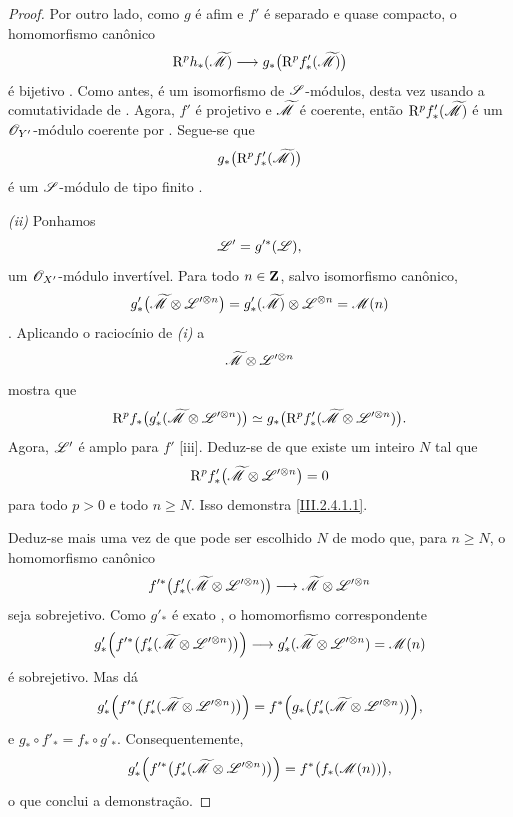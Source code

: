 \begin{proof}
Por outro lado, como $g$ é afim e $f'$ é separado e quase compacto, o homomorfismo canônico
\[
  \mathrm{R}^p h_*(\widetilde{\mathscr{M}})
  \longrightarrow
  g_*\bigl(\mathrm{R}^p f'_*(\widetilde{\mathscr{M}})\bigr)
\]
é bijetivo .
Como antes, é um isomorfismo de $\mathscr{S}$-módulos, desta vez usando a comutatividade de .
Agora, $f'$ é projetivo e $\widetilde{\mathscr{M}}$ é coerente, então $\mathrm{R}^p f'_*(\widetilde{\mathscr{M}})$ é um $\mathscr{O}_{Y'}$-módulo coerente por .
Segue-se que
\[
  g_*\bigl(\mathrm{R}^p f'_*(\widetilde{\mathscr{M}})\bigr)
\]
é um $\mathscr{S}$-módulo de tipo finito .

\emph{(ii)} Ponhamos
\[
  \mathscr{L}'=g'^*(\mathscr{L}),
\]
um $\mathscr{O}_{X'}$-módulo invertível.
Para todo $n\in\mathbf Z$, salvo isomorfismo canônico,
\[
  g'_*\bigl(\widetilde{\mathscr{M}}\otimes\mathscr{L}'^{\otimes n}\bigr)
  =
  g'_*(\widetilde{\mathscr{M}})\otimes\mathscr{L}^{\otimes n}
  =
  \mathscr{M}(n)
\]
.
Aplicando o raciocínio de \emph{(i) } a
\[
  \widetilde{\mathscr{M}}\otimes\mathscr{L}'^{\otimes n}
\]
mostra que
\[
  \mathrm{R}^p f_*
  \bigl(g'_*(\widetilde{\mathscr{M}}\otimes\mathscr{L}'^{\otimes n})\bigr)
  \simeq
  g_*\bigl(\mathrm{R}^p f'_*
  (\widetilde{\mathscr{M}}\otimes\mathscr{L}'^{\otimes n})\bigr).
\]
Agora, $\mathscr{L}'$ é amplo para $f'$  [iii].
Deduz-se de  que existe um inteiro $N$ tal que
\[
  \mathrm{R}^p f'_*
  \bigl(\widetilde{\mathscr{M}}\otimes\mathscr{L}'^{\otimes n}\bigr)=0
\]
para todo $p>0$ e todo $n\geq N$.
Isso demonstra \eqref{III.2.4.1.1}.

Deduz-se mais uma vez de  que pode ser escolhido $N$ de modo que, para $n\geq N$, o homomorfismo canônico
\[
  f'^*\bigl(f'_*(\widetilde{\mathscr{M}}\otimes\mathscr{L}'^{\otimes n})\bigr)
  \longrightarrow
  \widetilde{\mathscr{M}}\otimes\mathscr{L}'^{\otimes n}
\]
seja sobrejetivo.
Como $g'_*$ é exato , o homomorfismo correspondente
\[
  g'_*\Bigl(
    f'^*\bigl(f'_*(\widetilde{\mathscr{M}}\otimes\mathscr{L}'^{\otimes n})\bigr)
  \Bigr)
  \longrightarrow
  g'_*(\widetilde{\mathscr{M}}\otimes\mathscr{L}'^{\otimes n})
  =\mathscr{M}(n)
\]
é sobrejetivo.
Mas  dá
\[
  g'_*\Bigl(
    f'^*\bigl(f'_*(\widetilde{\mathscr{M}}\otimes\mathscr{L}'^{\otimes n})\bigr)
  \Bigr)
  =
  f^*\Bigl(
    g_*\bigl(f'_*(\widetilde{\mathscr{M}}\otimes\mathscr{L}'^{\otimes n})\bigr)
  \Bigr),
\]
e $g_*\circ f'_*=f_*\circ g'_*$.
Consequentemente,
\[
  g'_*\Bigl(
    f'^*\bigl(f'_*(\widetilde{\mathscr{M}}\otimes\mathscr{L}'^{\otimes n})\bigr)
  \Bigr)
  =
  f^*\bigl(f_*(\mathscr{M}(n))\bigr),
\]
o que conclui a demonstração.
\end{proof}

